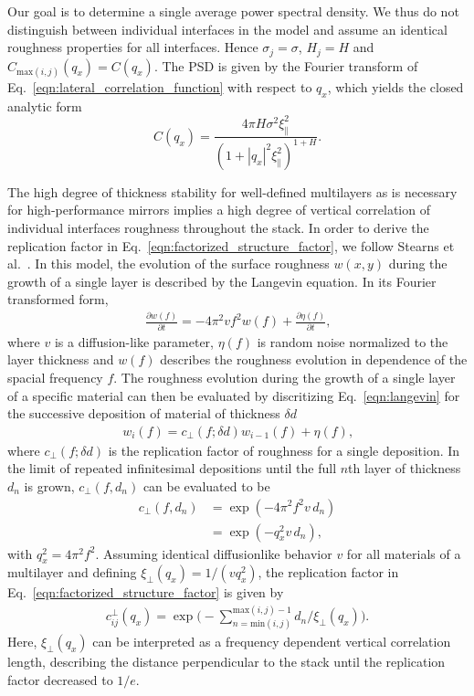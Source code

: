 \documentclass[twocolumn,osajnl,showpacs,superscriptaddress,11pt]{revtex4-1}
\begin{document}
Our goal is to determine a single average power spectral density. We thus do not distinguish between individual interfaces in the model and assume an identical roughness properties for all interfaces. Hence $\sigma_j = \sigma$, $H_j = H$ and $C_{\text{max}(i,j)}(q_x) = C(q_x)$. The PSD is given by the Fourier transform of Eq.~\eqref{eqn:lateral_correlation_function} with respect to $q_x$, which yields the closed analytic form
\begin{equation}
	C(q_x) = \frac{4 \pi H \sigma^2 \xi_\parallel^2}{(1+|q_x|^2\xi_\parallel^2)^{1+H}} \text{.} \label{eqn:psd} 
\end{equation}


The high degree of thickness stability for well-defined multilayers as is necessary for high-performance mirrors implies a high degree of vertical correlation of individual interfaces roughness throughout the stack. In order to derive the replication factor in Eq.~\eqref{eqn:factorized_structure_factor}, we follow Stearns et al.~\cite{stearns:4286}. In this model, the evolution of the surface roughness $w(x,y)$ during the growth of a single layer is described by the Langevin equation. In its Fourier transformed form, 
\begin{align}
\frac{\partial w(f)}{\partial t} = - 4 \pi^2 v f^2 w(f) + \frac{\partial \eta(f)}{\partial t} \text{,} \label{eqn:langevin}
\end{align}
where $v$ is a diffusion-like parameter, $\eta(f)$ is random noise normalized to the layer thickness and $w(f)$ describes the roughness evolution in dependence of the spacial frequency $f$. The roughness evolution during the growth of a single layer of a specific material can then be evaluated by discritizing Eq.~\eqref{eqn:langevin} for the successive deposition of material of thickness $\delta d$
\begin{align}
w_i(f) = c_\perp(f;\delta d) w_{i-1}(f) + \eta(f) \text{,}
\end{align}
where $c_\perp(f;\delta d)$ is the replication factor of roughness for a single deposition. In the limit of repeated infinitesimal depositions until the full $n$th layer of thickness $d_n$ is grown, $c_\perp(f,d_n)$ can be evaluated to be \cite{spiller1993multilayer}
\begin{align}
    c_\perp(f,d_n) &= \exp(-4\pi^2 f^2 v \,d_n) \nonumber \\
                   &= \exp(-q_x^2 v \,d_n)\text{,}
\end{align}
with $q_x^2 = 4 \pi^2 f^2$. Assuming identical diffusionlike behavior $v$ for all materials of a multilayer and defining $\xi_\perp(q_x) = 1/(v q_x^2)$, the replication factor in Eq.~\eqref{eqn:factorized_structure_factor} is given by
\begin{align}
c_{ij}^\perp(q_x) =  \exp\Bigg(-\sum \limits_{n = \text{min}(i,j)}^{\text{max}(i,j)-1}d_n/\xi_\perp(q_x) \Bigg)\text{.}
\end{align}
Here, $\xi_\perp(q_x)$ can be interpreted as a frequency dependent vertical correlation length, describing the distance perpendicular to the stack until the replication factor decreased to $1/e$.
\end{document}
